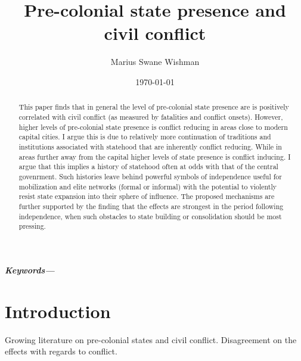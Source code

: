 \documentclass[12pt]{article}
\title{Pre-colonial state presence and civil conflict}
\author[1]{Marius Swane Wishman}
\affil[1]{Department of Sociology and Political Science, NTNU}
\date{\today}
\providecommand{\keywords}[1]
{
	\small	
	\textbf{\textit{Keywords---}} #1
}
\begin{document}
\maketitle

\begin{abstract}

This paper finds that in general the level of pre-colonial state presence are is
positively correlated with civil conflict (as measured by fatalities and
conflict onsets). However, higher levels of pre-colonial state presence is
conflict reducing in areas close to modern capital cities. I argue this is due
to relatively more continuation of traditions and institutions associated with
statehood that are inherently conflict reducing. While in areas further away
from the capital higher levels of state presence is conflict inducing. I argue
that this implies a history of statehood often at odds with that of the central
govenrment. Such histories leave behind powerful symbols of independence useful
for mobilization and elite networks (formal or informal) with the potential to
violently resist state expansion into their sphere of influence. The proposed
mechanisms are further supported by the finding that the effects are strongest
in the period following independence, when such obstacles to state building or
consolidation should be most pressing.

\end{abstract}

\keywords{}


\onehalfspacing


\section{Introduction}

Growing literature on pre-colonial states and civil conflict. Disagreement on
the effects with regards to conflict.
\end{document}
